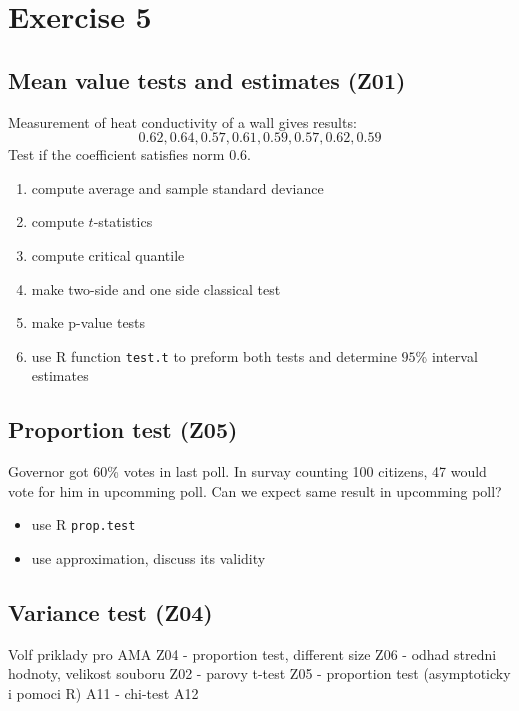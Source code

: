 \documentclass[4pt]{article}
\begin{document}
\pagebreak


\section{Exercise 5}

\subsection{Mean value tests and estimates (Z01)}
Measurement of heat conductivity of a wall gives results:
\[
    0.62, 0.64, 0.57,0.61, 0.59, 0.57, 0.62, 0.59
\]
Test if the coefficient satisfies norm $0.6$.

\begin{enumerate}
 \item compute average and sample standard deviance
 \item compute $t$-statistics
 \item compute critical quantile
 \item make two-side and one side classical test
 \item make p-value tests
 \item use R function \verb'test.t' to preform both tests and determine $95\%$ interval estimates
\end{enumerate}

\subsection{Proportion test (Z05)}
Governor got 60\% votes in last poll. In survay counting 100 citizens,
47 would vote for him in upcomming poll. Can we expect same result in upcomming poll?
\begin{itemize}
 \item use R \verb'prop.test'
 \item use approximation, discuss its validity
\end{itemize}


\subsection{Variance test (Z04)}
Volf priklady pro AMA
Z04 - proportion test, different size
Z06 - odhad stredni hodnoty, velikost souboru
Z02 - parovy t-test
Z05 - proportion test (asymptoticky i pomoci R)
A11 - chi-test
A12 
\end{document}
